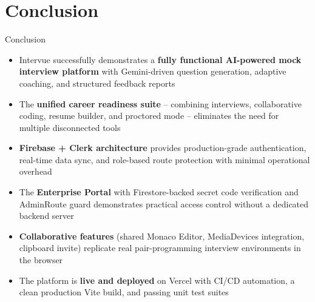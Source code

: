 \documentclass{beamer}
\begin{document}
\section{Conclusion}
\begin{frame}{Conclusion}
\begin{itemize}
    \item Intervue successfully demonstrates a \textbf{fully functional AI-powered mock interview platform} with Gemini-driven question generation, adaptive coaching, and structured feedback reports

    \item The \textbf{unified career readiness suite} -- combining interviews, collaborative coding, resume builder, and proctored mode -- eliminates the need for multiple disconnected tools

    \item \textbf{Firebase + Clerk architecture} provides production-grade authentication, real-time data sync, and role-based route protection with minimal operational overhead

    \item The \textbf{Enterprise Portal} with Firestore-backed secret code verification and AdminRoute guard demonstrates practical access control without a dedicated backend server

    \item \textbf{Collaborative features} (shared Monaco Editor, MediaDevices integration, clipboard invite) replicate real pair-programming interview environments in the browser

    \item The platform is \textbf{live and deployed} on Vercel with CI/CD automation, a clean production Vite build, and passing unit test suites
\end{itemize}
\end{frame}

\end{document}
